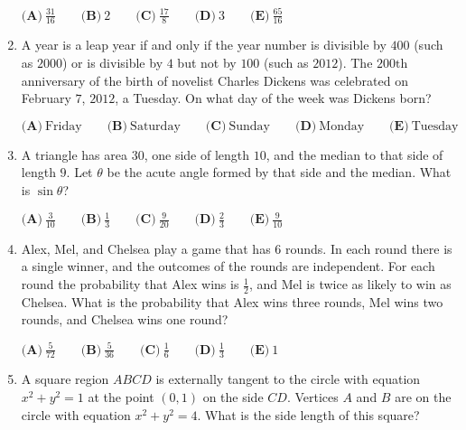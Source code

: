 \documentclass{article}
\begin{document}
\begin{enumerate}[label=\arabic*., itemsep=0.5em]
$ \textbf{(A)}\ \frac{31}{16}\qquad\textbf{(B)}\ 2\qquad\textbf{(C)}\ \frac{17}{8}\qquad\textbf{(D)}\ 3\qquad\textbf{(E)}\ \frac{65}{16} $\par \vspace{0.5em}\item A year is a leap year if and only if the year number is divisible by $400$ (such as $2000$) or is divisible by $4$ but not by $100$ (such as $2012$).  The $200\text{th}$ anniversary of the birth of novelist Charles Dickens was celebrated on February $7$, $2012$, a Tuesday.  On what day of the week was Dickens born?

$ \textbf{(A)}\ \text{Friday}
\qquad\textbf{(B)}\ \text{Saturday}
\qquad\textbf{(C)}\ \text{Sunday}
\qquad\textbf{(D)}\ \text{Monday}
\qquad\textbf{(E)}\ \text{Tuesday}
 $\par \vspace{0.5em}\item A triangle has area $30$, one side of length $10$, and the median to that side of length $9$.  Let $\theta$ be the acute angle formed by that side and the median.  What is $\sin{\theta}$?

$ \textbf{(A)}\ \frac{3}{10}\qquad\textbf{(B)}\ \frac{1}{3}\qquad\textbf{(C)}\ \frac{9}{20}\qquad\textbf{(D)}\ \frac{2}{3}\qquad\textbf{(E)}\ \frac{9}{10} $\par \vspace{0.5em}\item Alex, Mel, and Chelsea play a game that has $6$ rounds.  In each round there is a single winner, and the outcomes of the rounds are independent.  For each round the probability that Alex wins is $\frac{1}{2}$, and Mel is twice as likely to win as Chelsea.  What is the probability that Alex wins three rounds, Mel wins two rounds, and Chelsea wins one round?

$ \textbf{(A)}\ \frac{5}{72}\qquad\textbf{(B)}\ \frac{5}{36}\qquad\textbf{(C)}\ \frac{1}{6}\qquad\textbf{(D)}\ \frac{1}{3}\qquad\textbf{(E)}\ 1 $\par \vspace{0.5em}\item A square region $ABCD$ is externally tangent to the circle with equation $x^2+y^2=1$ at the point $(0,1)$ on the side $CD$.  Vertices $A$ and $B$ are on the circle with equation $x^2+y^2=4$.  What is the side length of this square?


\end{enumerate}
\end{document}
